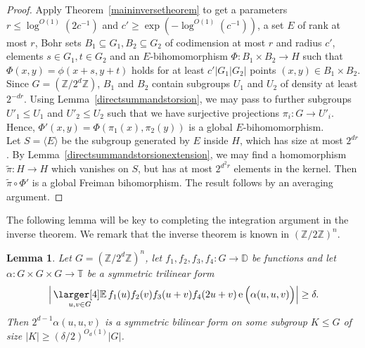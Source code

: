\documentclass[a4paper,11pt]{article}
\numberwithin{theorem}{section}
\newtheorem{lemma}[theorem]{Lemma}
\theoremstyle{definition}
\newcommand{\on}[1]{
	\operatorname{#1}
}
\newcommand{\exx}{
  \mathop{
    \mathchoice{\vcenter{\hbox{\larger[4]$\mathbb{E}$}}}
               {\kern0pt\mathbb{E}}
               {\kern0pt\mathbb{E}}
               {\kern0pt\mathbb{E}}
  }\displaylimits
}
\begin{document}
\begin{proof}
    Apply Theorem~\ref{maininversetheorem} to get a parameters $r \leq \log^{O(1)}(2c^{-1})$ and $c' \geq \exp(-\log^{O(1)}(c^{-1}))$, a set $E$ of rank at most $r$, Bohr sets $B_1 \subseteq G_1, B_2 \subseteq G_2$ of codimension at most $r$ and radius $c'$, elements $s \in G_1,t\in G_2$ and an $E$-bihomomorphism $\Phi : B_1 \times B_2 \to H$ such that $\Phi(x,y) = \phi(x + s,y + t)$ holds for at least $c'|G_1|G_2|$ points $(x,y) \in B_1 \times B_2$. Since $G = (\mathbb{Z}/2^d\mathbb{Z})$, $B_1$ and $B_2$ contain subgroups $U_1$ and $U_2$ of density at least $2^{-dr}$. Using Lemma~\ref{directsummandstorsion}, we may pass to further subgroups $U'_1 \leq U_1$ and $U'_2 \leq U_2$ such that we have surjective projections $\pi_i : G \to U'_i$. Hence, $\Phi'(x,y) = \Phi(\pi_1(x), \pi_2(y))$ is a global $E$-bihomomorphism.\\
    Let $S = \langle E\rangle$ be the subgroup generated by $E$ inside $H$, which has size at most $2^{dr}$. By Lemma~\ref{directsummandstorsionextension}, we may find a homomorphism $\tilde{\pi} : H \to H$ which vanishes on $S$, but has at most $2^{d^2r}$ elements in the kernel. Then $\tilde{\pi} \circ \Phi'$ is a global Freiman bihomorphism. The result follows by an averaging argument.
\end{proof}

The following lemma will be key to completing the integration argument in the inverse theorem. We remark that the inverse theorem is known in $(\mathbb{Z}/2\mathbb{Z})^n$.

\begin{lemma}\label{correlationforsymmetrytorsionLemma} Let $G = (\mathbb{Z}/2^d\mathbb{Z})^n$, let $f_1, f_2, f_3, f_4 : G \to \mathbb{D}$ be functions and let $\alpha : G \times G \times G \to \mathbb{T}$ be a symmetric trilinear form
    \begin{equation}\Big|\exx_{u , v \in G} f_1(u) f_2(v) f_3(u + v) f_4(2u + v) \on{e}\Big(\alpha(u,u, v)\Big)\Big| \geq \delta.\label{keycorrelationforsymmetrytorsion}\end{equation}
    Then $2^{d-1} \alpha(u,u,v)$ is a symmetric bilinear form on some subgroup $K \leq G$ of size $|K| \geq ( \delta/2)^{O_d(1)}|G|$.
\end{lemma}
\end{document}
